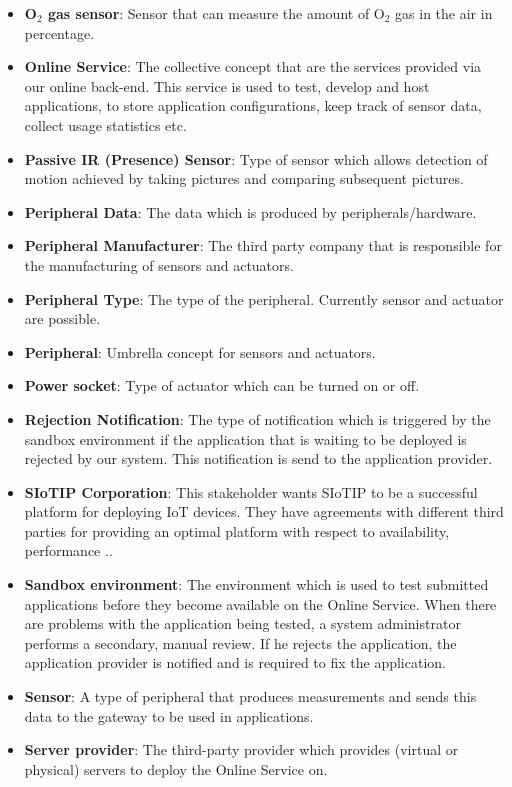 \documentclass[english]{sareport}
\begin{document}
\begin{itemize}
	\item \textbf{O$_2$ gas sensor}: Sensor that can measure the amount of O$_2$ gas in the air  in percentage.
	\item \textbf{Online Service}: The collective concept that are the services provided via our online back-end. This service is used to test, develop and host applications, to store application configurations, keep track of sensor data, collect usage statistics etc. 
	\item \textbf{Passive IR (Presence) Sensor}: Type of sensor which allows detection of motion achieved by taking pictures and comparing subsequent pictures.
	\item \textbf{Peripheral Data}: The data which is produced by peripherals/hardware.
	\item \textbf{Peripheral Manufacturer}: The third party company that is responsible for the manufacturing of sensors and actuators.
	\item \textbf{Peripheral Type}: The type of the peripheral. Currently sensor and actuator are possible.
	\item \textbf{Peripheral}: Umbrella concept for sensors and actuators.
	\item \textbf{Power socket}: Type of actuator which can be turned on or off.
	\item \textbf{Rejection Notification}: The type of notification which is triggered by the sandbox environment if the application that is waiting to be deployed is rejected by our system. This notification is send to the application provider.
	\item \textbf{SIoTIP Corporation}: This stakeholder wants SIoTIP to be a successful platform for deploying IoT devices. They have agreements with different third parties for providing an optimal platform with respect to availability, performance ..
	\item \textbf{Sandbox environment}: The environment which is used to test submitted applications before they become available on the Online Service. When there are problems with the application being tested, a system administrator performs a secondary, manual review. If he rejects the application, the application provider is notified and is required to fix the application.
	\item \textbf{Sensor}: A type of peripheral that produces measurements and sends this data to the gateway to be used in applications.
	\item \textbf{Server provider}: The third-party provider which provides (virtual or physical) servers to deploy the Online Service on.

\end{itemize}
\end{document}
